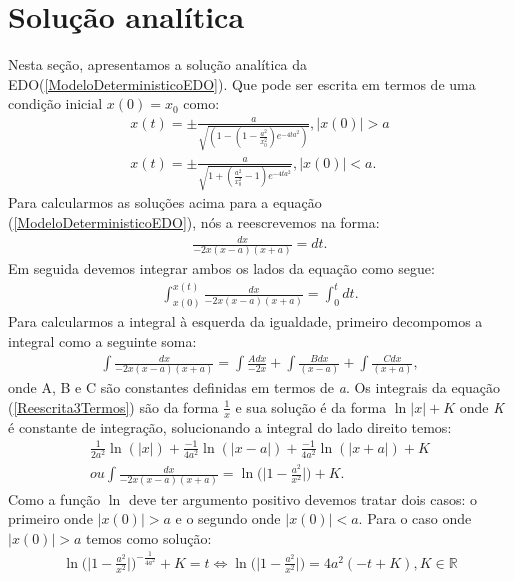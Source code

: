 \section{Solução analítica}
Nesta seção, apresentamos a solução analítica da EDO(\ref{ModeloDeterministicoEDO}). Que pode ser escrita em termos de uma condição inicial $x(0) = x_{0}$ como:
\begin{eqnarray}\label{eq134}
x(t) = \pm \frac{a}{\sqrt{(1-(1-\frac{a^{2}}{x_{0}^{2}})e^{-4ta^{2}})}}, |x(0)| > a \\
x(t) = \pm \frac{a}{\sqrt{1+(\frac{a^{2}}{x_{0}^{2}}-1)e^{-4ta^{2}}}} , |x(0)| < a.
\end{eqnarray}
Para calcularmos as soluções acima para a equação (\ref{ModeloDeterministicoEDO}), nós a reescrevemos na forma:
\begin{eqnarray}
\frac{dx}{-2x(x-a)(x+a)} = dt.
\end{eqnarray}
Em seguida devemos integrar ambos os lados da equação como segue:
\begin{eqnarray}
\int_{x(0)}^{x(t)}{\frac{dx}{-2x(x-a)(x+a)}} = \int_{0}^{t}{dt}.
\end{eqnarray}
Para calcularmos a integral à esquerda da igualdade, primeiro decompomos a integral como a seguinte soma:
\begin{eqnarray}\label{Reescrita3Termos}
\int \frac{dx}{-2x(x-a)(x+a)} = \int \frac{A dx}{-2x} + \int \frac{B dx}{(x-a)} + \int \frac{C dx}{(x+a)} , 
\end{eqnarray}
onde A, B e C são constantes definidas em termos de \textit{a}. Os integrais da equação (\ref{Reescrita3Termos}) são da forma $\frac{1}{x}$ e sua solução é da forma $\ln|x| + K$ onde \textit{K} é constante de integração, solucionando a integral do lado direito temos:
\begin{eqnarray}\label{Integrada5}
\frac{1}{2a^{2}} \ln (|x|) + \frac{-1}{4a^{2}} \ln (|x-a|) + \frac{-1}{4a^{2}} \ln (|x+a|) + K \\ ou
\int \frac{dx}{-2x(x-a)(x+a)} = \ln \biggl( \biggl | 1 - \frac{a^{2}}{x^{2}} \biggr | \biggr ) + K.
\end{eqnarray}
Como a função $\ln$ deve ter argumento positivo devemos tratar dois casos: o primeiro onde $|x(0)| > a$ e o segundo onde $|x(0)| < a$. Para o caso onde $|x(0)| > a$ temos como solução:
\begin{eqnarray}\label{Integrada2}
\ln \biggl( \biggl | 1 - \frac{a^{2}}{x^{2}} \biggr | \biggr)^{-\frac{1}{4a^{2}}} + K = t \Leftrightarrow \ln \biggl( \biggl | 1 - \frac{a^{2}}{x^{2}} \biggr | \biggr) = 4a^{2}(-t+K), K  \in \mathbb{R} 
\end{eqnarray}
